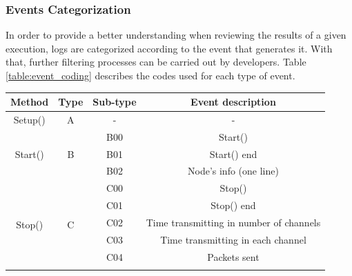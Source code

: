 \documentclass[a4paper]{article}
\begin{document}
		\subsubsection{Events Categorization}
		\label{section:events_categorization}	
		In order to provide a better understanding when reviewing the results of a given execution, logs are categorized according to the event that generates it. With that, further filtering processes can be carried out by developers. Table \ref{table:event_coding} describes the codes used for each type of event.		
		\begin{table}[]
		\centering
		\scriptsize
		\begin{tabular}{|c|c|c|c|}
		\hline
		\textbf{Method}                            & \textbf{Type}       & \textbf{Sub-type} & \textbf{Event description}                              \\ \hline
		Setup()                                    & A                   & -                 & -                                                       \\ \hline
		\multirow{3}{*}{Start()}                   & \multirow{3}{*}{B}  & B00               & Start()                                                 \\ \cline{3-4} 
		                                           &                     & B01               & Start() end                                             \\ \cline{3-4} 
		                                           &                     & B02               & Node's info (one line)                                  \\ \hline
		\multirow{6}{*}{Stop()}                    & \multirow{6}{*}{C}  & C00               & Stop()                                                  \\ \cline{3-4} 
		                                           &                     & C01               & Stop() end                                              \\ \cline{3-4} 
		                                           &                     & C02               & Time transmitting in number of channels                 \\ \cline{3-4} 
		                                           &                     & C03               & Time transmitting in each channel                       \\ \cline{3-4} 
		                                           &                     & C04               & Packets sent                                            \\ \cline{3-4} 

\end{tabular}
\end{table}
\end{document}
